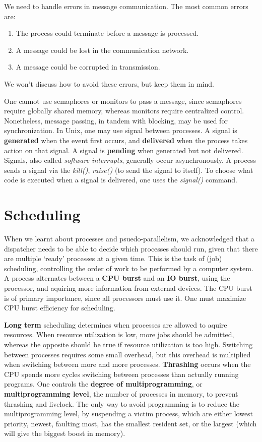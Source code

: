 We need to handle errors in message communication. The most common errors are:
%
\begin{enumerate}
    \item The process could terminate before a message is processed.
    \item A message could be lost in the communication network.
    \item A message could be corrupted in transmission.
\end{enumerate}
%
We won't discuss how to avoid these errors, but keep them in mind.

One cannot use semaphores or monitors to pass a message, since semaphores require globally shared memory, whereas monitors require centralized control. Nonetheless, message passing, in tandem with blocking, may be used for synchronization. In Unix, one may use signal between processes. A signal is {\bf generated} when the event first occurs, and {\bf delivered} when the process takes action on that signal. A signal is {\bf pending} when generated but not delivered. Signals, also called {\it software interrupts}, generally occur asynchronously. A process sends a signal via the {\it kill()}, {\it raise()} (to send the signal to itself). To choose what code is executed when a signal is delivered, one uses the {\it signal()} command.





\chapter{Scheduling}

When we learnt about processes and psuedo-parallelism, we acknowledged that a dispatcher needs to be able to decide which processes should run, given that there are multiple `ready' processes at a given time. This is the task of (job) scheduling, controlling the order of work to be performed by a computer system. A process alternates between a {\bf CPU burst} and an {\bf IO burst}, using the processor, and aquiring more information from external devices. The CPU burst is of primary importance, since all processors must use it. One must maximize CPU burst efficiency for scheduling.

{\bf Long term} scheduling determines when processes are allowed to aquire resources. When resource utilization is low, more jobs should be admitted, whereas the opposite should be true if resource utilization is too high. Switching between processes requires some small overhead, but this overhead is multiplied when switching between more and more processes. {\bf Thrashing} occurs when the CPU spends more cycles switching between processes than actually running programs. One controls the {\bf degree of multiprogramming}, or {\bf multiprogramming level}, the number of processes in memory, to prevent thrashing and livelock. The only way to avoid programming is to reduce the multiprogramming level, by suspending a victim process, which are either lowest priority, newest, faulting most, has the smallest resident set, or the largest (which will give the biggest boost in memory).

